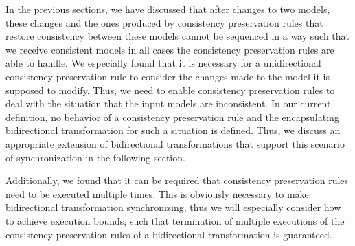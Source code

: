 In the previous sections, we have discussed that after changes to two models, these changes and the ones produced by consistency preservation rules that restore consistency between these models cannot be sequenced in a way such that we receive consistent models in all cases the consistency preservation rules are able to handle.
We especially found that it is necessary for a unidirectional consistency preservation rule to consider the changes made to the model it is supposed to modify.
Thus, we need to enable consistency preservation rules to deal with the situation that the input models are inconsistent.
In our current definition, no behavior of a consistency preservation rule and the encapsulating bidirectional transformation for such a situation is defined.
Thus, we discuss an appropriate extension of bidirectional transformations that support this scenario of synchronization in the following section.

Additionally, we found that it can be required that consistency preservation rules need to be executed multiple times.
This is obviously necessary to make bidirectional transformation synchronizing, thus we will especially consider how to achieve execution bounds, such that termination of multiple executions of the consistency preservation rules of a bidirectional transformation is guaranteed.








    
